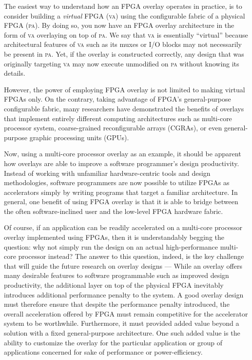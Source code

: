The easiest way to understand how an FPGA overlay operates in practice, is to consider building a \emph{virtual} FPGA (\textsc{va}) using the configurable fabric of a physical FPGA (\textsc{pa}).  By doing so, you now have an FPGA overlay architecture in the form of \textsc{va} overlaying on top of \textsc{pa}.  We say that \textsc{va} is essentially ``virtual'' because architectural features of \textsc{va} such as its muxes or I/O blocks may not necessarily be present in \textsc{pa}.  Yet, if the overlay is constructed correctly, any design that was originally targeting \textsc{va} may now execute unmodified on \textsc{pa} without knowing its details.

However, the power of employing FPGA overlay is not limited to making virtual FPGAs only.
On the contrary, taking advantage of FPGA's general-purpose configurable fabric, many researchers have demonstrated the benefits of overlays that implement entirely different computing architectures such as 
multi-core processor system, coarse-grained reconfigurable arrays (CGRAs), or even general-purpose graphic processing units (GPUs).

Now, using a multi-core processor overlay as an example, it should be apparent how overlays are able to improve a software programmer's design productivity.
Instead of working with unfamiliar hardware-centric tools and design methodologies, software programmers are now possible to utilize FPGAs as accelerators simply by writing programs that target a familiar architecture.
In general, one benefit of using FPGA overlay is that it is able to bridge between the often software-inclined user and the low-level FPGA hardware fabric.

Of course, if an application can be readily accelerated on a multi-core processor overlay implemented using FPGAs, then it is understandably begging the question: why not simply run the design on an actual high-performance multi-core processor instead?
The answer to this question, indeed, is the key challenge that will guide the future research on overlay designs --- While an overlay offers many desirable features to software programmable such as improved design productivity, the additional layer on top of the physical FPGA inevitably introduces additional performance penalty to the system.
A good overlay design must therefore ensure that despite the performance penalty introduced, the overall acceleration offered by FPGA must remain competitive for the accelerator system to be worthwhile.
Furthermore, it must provided added value beyond a solution with a fixed general-purpose architecture.
One such added value is the ability to customize the overlay for the particular application or group of applications concerned for sake of performance or power-efficiency.



